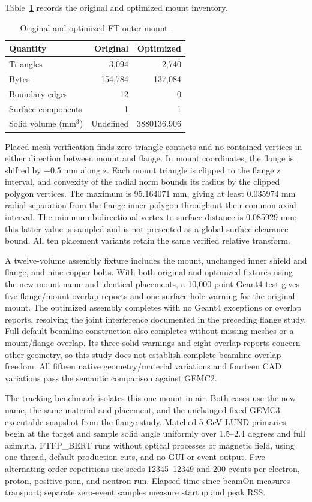 Table~\ref{tab:outer-mount-mesh} records the original and optimized mount inventory.

\begin{table}[htbp]
\centering
\caption{Original and optimized FT outer mount.}
\label{tab:outer-mount-mesh}
\begin{tabular}{lrr}
\toprule
Quantity & Original & Optimized \\
\midrule
Triangles & 3,094 & 2,740 \\
Bytes & 154,784 & 137,084 \\
Boundary edges & 12 & 0 \\
Surface components & 1 & 1 \\
Solid volume (mm$^3$) & Undefined & 3880136.906 \\
\bottomrule
\end{tabular}
\end{table}

Placed-mesh verification finds zero triangle contacts and no contained vertices in either direction between
mount and flange. In mount coordinates, the flange is shifted by +0.5 mm along z. Each mount triangle is
clipped to the flange z interval, and convexity of the radial norm bounds its radius by the clipped polygon
vertices. The maximum is 95.164071 mm, giving at least 0.035974 mm radial separation from the flange inner
polygon throughout their common axial interval. The minimum bidirectional vertex-to-surface distance is
0.085929 mm; this latter value is sampled and is not presented as a global surface-clearance bound. All ten
placement variants retain the same verified relative transform.

A twelve-volume assembly fixture includes the mount, unchanged inner shield and flange, and nine copper
bolts. With both original and optimized fixtures using the new mount name and identical placements, a
10,000-point Geant4 test gives five flange/mount overlap reports and one surface-hole warning for the
original mount. The optimized assembly completes with no Geant4 exceptions or overlap reports, resolving the
joint interference documented in the preceding flange study. Full default beamline construction also
completes without missing meshes or a mount/flange overlap. Its three solid warnings and eight overlap
reports concern other geometry, so this study does not establish complete beamline overlap freedom. All
fifteen native geometry/material variations and fourteen CAD variations pass the semantic comparison against
GEMC2.

The tracking benchmark isolates this one mount in air. Both cases use the new name, the same material and
placement, and the unchanged fixed GEMC3 executable snapshot from the flange study. Matched 5 GeV LUND
primaries begin at the target and sample solid angle uniformly over 1.5--2.4 degrees and full azimuth.
FTFP\_BERT runs without optical processes or magnetic field, using one thread, default production cuts, and
no GUI or event output. Five alternating-order repetitions use seeds 12345--12349 and 200 events per
electron, proton, positive-pion, and neutron run. Elapsed time since beamOn measures transport; separate
zero-event samples measure startup and peak RSS.

